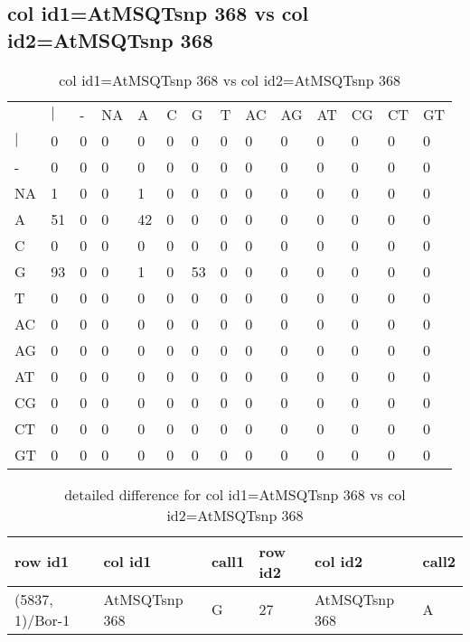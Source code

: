 \subsection{col id1=AtMSQTsnp 368 vs col id2=AtMSQTsnp 368}
\begin{center}
\begin{longtable}{|l|l|l|l|l|l|l|l|l|l|l|l|l|l|}
\caption{col id1=AtMSQTsnp 368 vs col id2=AtMSQTsnp 368} \label{table_dm684}\\
\hline
\\
\hline
&$|$&-&NA&A&C&G&T&AC&AG&AT&CG&CT&GT\\
$|$&0&0&0&0&0&0&0&0&0&0&0&0&0\\
-&0&0&0&0&0&0&0&0&0&0&0&0&0\\
NA&1&0&0&1&0&0&0&0&0&0&0&0&0\\
A&51&0&0&42&0&0&0&0&0&0&0&0&0\\
C&0&0&0&0&0&0&0&0&0&0&0&0&0\\
G&93&0&0&1&0&53&0&0&0&0&0&0&0\\
T&0&0&0&0&0&0&0&0&0&0&0&0&0\\
AC&0&0&0&0&0&0&0&0&0&0&0&0&0\\
AG&0&0&0&0&0&0&0&0&0&0&0&0&0\\
AT&0&0&0&0&0&0&0&0&0&0&0&0&0\\
CG&0&0&0&0&0&0&0&0&0&0&0&0&0\\
CT&0&0&0&0&0&0&0&0&0&0&0&0&0\\
GT&0&0&0&0&0&0&0&0&0&0&0&0&0\\
\hline
\end{longtable}
\end{center}

\begin{center}
\begin{longtable}{|l|l|l|l|l|l|}
\caption{detailed difference for col id1=AtMSQTsnp 368 vs col id2=AtMSQTsnp 368} \label{table_dm685}\\
\hline
row id1&col id1&call1&row id2&col id2&call2\\
\hline
(5837, 1)/Bor-1&AtMSQTsnp 368&G&27&AtMSQTsnp 368&A\\
\hline
\end{longtable}
\end{center}

